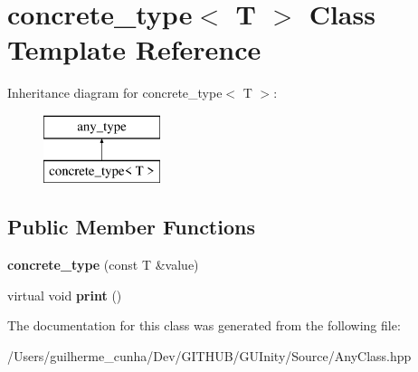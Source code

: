 \hypertarget{classconcrete__type}{}\section{concrete\+\_\+type$<$ T $>$ Class Template Reference}
\label{classconcrete__type}
Inheritance diagram for concrete\+\_\+type$<$ T $>$\+:\begin{figure}[H]
\begin{center}
\leavevmode
\includegraphics[height=2.000000cm]{classconcrete__type}
\end{center}
\end{figure}
\subsection*{Public Member Functions}
\begin{DoxyCompactItemize}
\item 
\hypertarget{classconcrete__type_ad0e185e3b1a29e1cb3e25c3db6993846}{}{\bfseries concrete\+\_\+type} (const T \&value)\label{classconcrete__type_ad0e185e3b1a29e1cb3e25c3db6993846}

\item 
\hypertarget{classconcrete__type_aa7da74fe0fea3d295f555ac3df96b937}{}virtual void {\bfseries print} ()\label{classconcrete__type_aa7da74fe0fea3d295f555ac3df96b937}

\end{DoxyCompactItemize}


The documentation for this class was generated from the following file\+:\begin{DoxyCompactItemize}
\item 
/\+Users/guilherme\+\_\+cunha/\+Dev/\+G\+I\+T\+H\+U\+B/\+G\+U\+Inity/\+Source/Any\+Class.\+hpp\end{DoxyCompactItemize}
